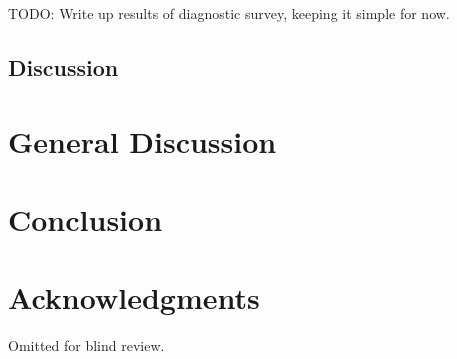 \documentclass{sigchi}\usepackage[]{graphicx}\usepackage[]{color}
\begin{document}
TODO: Write up results of diagnostic survey, keeping it simple for now.


\subsection{Discussion}


\section{General Discussion}


\section{Conclusion}


\section{Acknowledgments}
Omitted for blind review.

%
%
%
%
%
\balance



\end{document}

